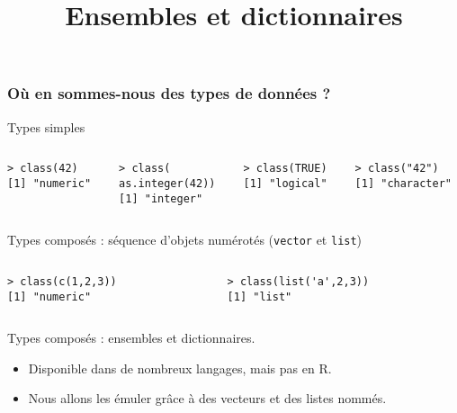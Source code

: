 \documentclass[10pt]{beamer}
\title{Ensembles et dictionnaires}
\begin{document}
\maketitle


\begin{frame}[fragile]
  \frametitle{Où en sommes-nous des types de données ?}
  \begin{block}{Types simples}
  
  \begin{columns}[t]
\begin{column}{0.25\textwidth}
  \begin{lstlisting}
> class(42)
[1] "numeric"
  \end{lstlisting}
\end{column}
\begin{column}{0.25\textwidth}
  \begin{lstlisting}
> class(
as.integer(42))
[1] "integer"
  \end{lstlisting}
\end{column}


\begin{column}{0.25\textwidth}
  \begin{lstlisting}
> class(TRUE)
[1] "logical"
  \end{lstlisting}
\end{column}
\begin{column}{0.25\textwidth}
  \begin{lstlisting}
> class("42")
[1] "character"
  \end{lstlisting}
\end{column}
\end{columns}
\end{block}


\begin{block}{Types composés : séquence d'objets numérotés (\texttt{vector} et \texttt{list})}
  
\begin{columns}[t]
\begin{column}{0.48\textwidth}
  \begin{lstlisting}
> class(c(1,2,3))
[1] "numeric"    
  \end{lstlisting}
\end{column}
\begin{column}{0.48\textwidth}
  \begin{lstlisting}
> class(list('a',2,3))
[1] "list"    
  \end{lstlisting}
\end{column}
\end{columns}
\end{block}

\begin{alertblock}{Types composés : ensembles et dictionnaires.}
  \begin{itemize}
  \item Disponible dans de nombreux langages, mais pas en R.
  \item<alert@1> Nous allons les émuler grâce à des vecteurs et des listes nommés.
  \end{itemize}
\end{alertblock}
\end{frame}
\end{document}
